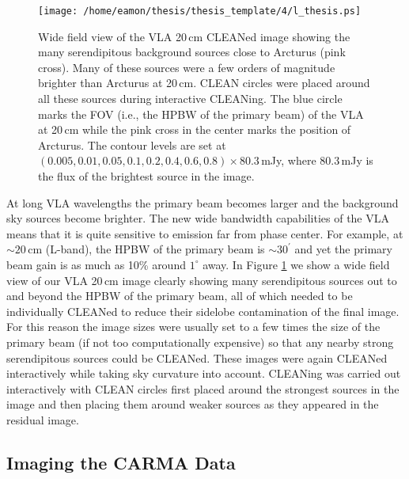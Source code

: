 \begin{figure}[hbt!]
\centering 
\texttt{[image: /home/eamon/thesis/thesis\_template/4/l\_thesis.ps]}  
\caption[Wide field view of the VLA 20\,cm image.]{Wide field view of the VLA 20\,cm CLEANed image showing the many serendipitous background sources close to Arcturus (pink cross). Many of these sources were a few orders of magnitude brighter than Arcturus at 20\,cm. CLEAN circles were placed around all these sources during interactive CLEANing. The blue circle marks the FOV (i.e., the HPBW of the primary beam) of the VLA at 20\,cm while the pink cross in the center marks the position of Arcturus. The contour levels are set at $(0.005,0.01,0.05,0.1,0.2,0.4,0.6,0.8)\times 80.3$\,mJy, where $80.3$\,mJy is the flux of the brightest source in the image.}
\label{fig:4.7}
\end{figure}

At long VLA wavelengths the primary beam becomes larger and the background sky sources become brighter. The new wide bandwidth capabilities of the VLA means that it is quite sensitive to emission far from phase center. For example, at $\sim 20$\,cm (L-band), the HPBW of the primary beam is $\sim 30^{\prime}$ and yet the primary beam gain is as much as 10\% around $1^{\circ}$ away. In Figure \ref{fig:4.7} we show a wide field view of our VLA 20\,cm image clearly showing many serendipitous sources out to and beyond the HPBW of the primary beam, all of which needed to be individually CLEANed to reduce their sidelobe contamination of the final image. For this reason the image sizes were usually set to a few times the size of the primary beam (if not too computationally expensive) so that any nearby strong serendipitous sources could be CLEANed. These images were again CLEANed interactively while taking sky curvature into account. CLEANing was carried out interactively with CLEAN circles first placed around the strongest sources in the image and then placing them around weaker sources as they appeared in the residual image. 
 
\subsection{Imaging the CARMA Data}\label{sec:4.3.2}

